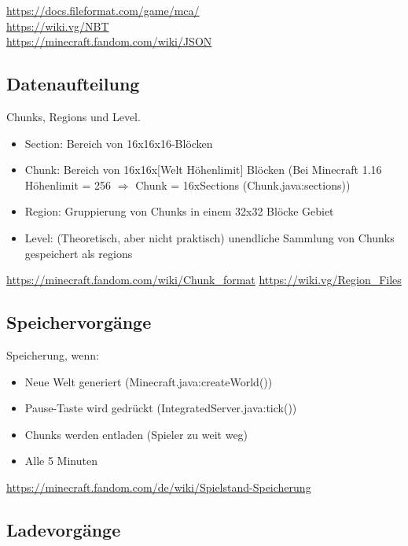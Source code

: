 \url{https://docs.fileformat.com/game/mca/}\\
\url{https://wiki.vg/NBT}\\
\url{https://minecraft.fandom.com/wiki/JSON}

\subsection{Datenaufteilung}
Chunks, Regions und Level. 

\begin{itemize}
    \item Section: Bereich von 16x16x16-Blöcken
    \item Chunk: Bereich von 16x16x$[$Welt Höhenlimit$]$ Blöcken (Bei Minecraft 1.16 Höhenlimit = 256 $\Rightarrow{}$ Chunk = 16xSections (Chunk.java:sections))
    \item Region: Gruppierung von Chunks in einem 32x32 Blöcke Gebiet
    \item Level: (Theoretisch, aber nicht praktisch) unendliche Sammlung von Chunks gespeichert als regions
\end{itemize}

\url{https://minecraft.fandom.com/wiki/Chunk_format}
\url{https://wiki.vg/Region_Files}

\subsection{Speichervorgänge}

Speicherung, wenn:
\begin{itemize}
    \item Neue Welt generiert (Minecraft.java:createWorld())
    \item Pause-Taste wird gedrückt (IntegratedServer.java:tick())
    \item Chunks werden entladen (Spieler zu weit weg)
    \item Alle 5 Minuten
\end{itemize}

\url{https://minecraft.fandom.com/de/wiki/Spielstand-Speicherung}

\subsection{Ladevorgänge}



